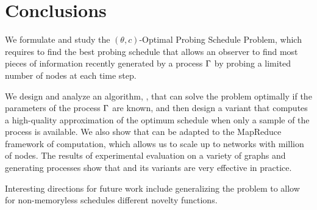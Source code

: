 \section{Conclusions}\label{sec:concl}
We formulate and study the $(\theta,c)$-Optimal Probing Schedule Problem,
which requires to find the best probing schedule that allows an observer to find
most pieces of information recently generated by a process $\Gamma$ by probing a
limited number of nodes at each time step.

We design and analyze an algorithm, \algoname, that can solve the problem
optimally if the parameters of the process $\Gamma$ are known, and then design a
variant that computes a high-quality approximation of the optimum schedule when
only a sample of the process is available. We also show that \algoname can be
adapted to the MapReduce framework of computation, which allows us to scale up
to networks with million of nodes. The results of experimental evaluation on a
variety of graphs and generating processes show that \algoname and its variants
are very effective in practice.

Interesting directions for future work include generalizing the problem to allow
for non-memoryless schedules different novelty functions.
